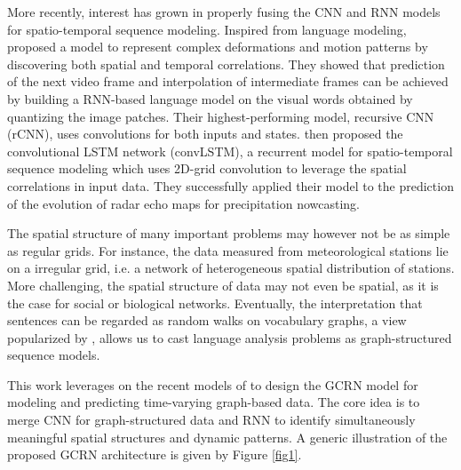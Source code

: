 \documentclass{article} %
\newcommand{\todo}[1]{{\color{red} #1 }}
\begin{document}
More recently, interest has grown in properly fusing the CNN and RNN models for
spatio-temporal sequence modeling. Inspired from language modeling,
\citet{video_language_model} proposed a model to represent complex deformations
and motion patterns by discovering both spatial and temporal correlations. They showed that prediction of the next video frame and
interpolation of intermediate frames can be achieved by building a RNN-based
language model on the visual words obtained by quantizing the image patches.
Their highest-performing model, recursive CNN (rCNN), uses convolutions for both
 inputs and states. \citet{convlstm}  then proposed the convolutional
LSTM network (convLSTM), a recurrent model for spatio-temporal sequence
modeling which uses 2D-grid convolution to leverage the spatial correlations in
input data. They successfully applied their model to the prediction of the
evolution of radar echo maps for precipitation nowcasting.



The spatial structure of many important problems may however not be as simple as regular grids. For instance, 
the data measured from meteorological stations lie on a irregular grid, i.e. a network of heterogeneous spatial
distribution of stations. More challenging, the spatial structure of data may not even be spatial, as it is the case for social or biological networks. Eventually, the interpretation that sentences can be regarded as random walks on vocabulary graphs,
a view popularized by \cite{word2vec}, allows us to cast language analysis problems as graph-structured sequence models.

This work leverages on the recent models of \cite{gcnn,video_language_model,convlstm} to design the GCRN model for modeling and predicting time-varying graph-based data. The core idea is to merge CNN for graph-structured data and RNN to identify simultaneously meaningful spatial structures and dynamic patterns. A generic illustration of the proposed GCRN architecture is given by Figure \ref{fig1}.
\end{document}
